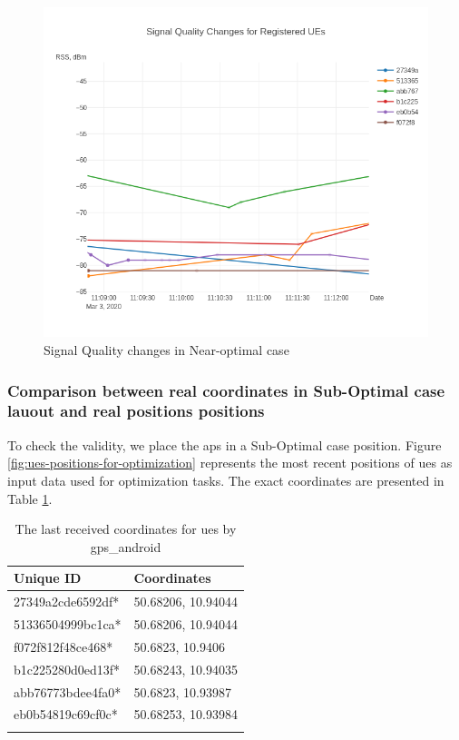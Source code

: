 \begin{figure}[H]
	\centering
	\includegraphics[width=0.7\linewidth,keepaspectratio]{images/Exp4_Near_Optimal.png}
\caption{Signal Quality changes in Near-optimal case}
\label{fig:signal-quality-changes-near-optimal}
\end{figure}

\subsubsection{Comparison between real coordinates in Sub-Optimal case lauout and real positions
positions}

To check the validity, we place the \glspl{ap} in a Sub-Optimal case position. Figure \ref{fig:ues-positions-for-optimization} represents the most recent positions  of \glspl{ue} as input data used for optimization tasks. The exact coordinates are presented in Table \ref{tab:exp4-sub-optimal-last-received-coordinates-ues}.

\begin{longtable}[]{@{}ll@{}}
	\caption{The last received coordinates for \glspl{ue} by \gls{gps_android}}\tabularnewline
	\toprule
	Unique ID & Coordinates\tabularnewline
	\midrule
	\endhead
	27349a2cde6592df* & 50.68206, 10.94044\tabularnewline
	51336504999bc1ca* & 50.68206, 10.94044\tabularnewline
	f072f812f48ce468* & 50.6823, 10.9406\tabularnewline
	b1c225280d0ed13f* & 50.68243, 10.94035\tabularnewline
	abb76773bdee4fa0* & 50.6823, 10.93987\tabularnewline
	eb0b54819c69cf0c* & 50.68253, 10.93984\tabularnewline
	\bottomrule
	\label{tab:exp4-sub-optimal-last-received-coordinates-ues}
\end{longtable}

